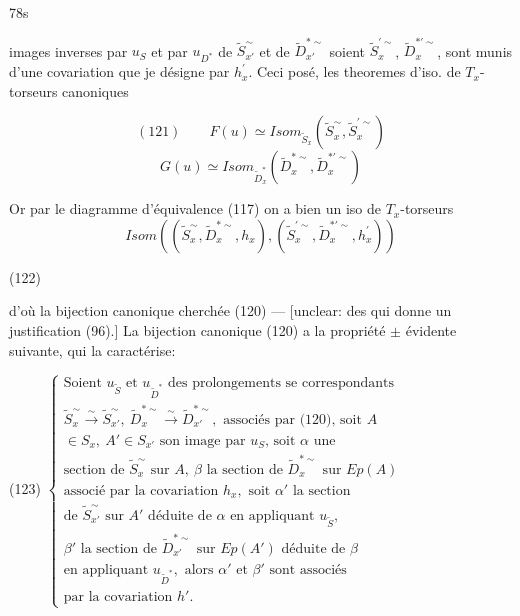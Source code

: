 78s

images inverses par $u_S$ et par $u_{D^*}$ de $\tilde{S}_{x'}^\sim$ et de $\tilde{D}_{x'}^{* \sim}$
soient $\tilde{S}_x^{\prime \sim}$, $\tilde{D}_x^{* \prime \sim}$, sont munis d'une covariation
que je désigne par $h_x^\prime$. Ceci posé, les theoremes
d'iso. de $T_x$-torseurs canoniques

$$ (121) \qquad F(u) \simeq Isom_{\tilde{S}_x}(\tilde{S}_x^\sim, \tilde{S}_x^{\prime \sim}) $$
$$ G(u) \simeq Isom_{\tilde{D}_x^*}(\tilde{D}_x^{*\sim}, \tilde{D}_x^{* \prime \sim}) $$

Or par le diagramme d'équivalence (117) on
a bien un iso de $T_x$-torseurs
$$ Isom((\tilde{S}_x^\sim, \tilde{D}_x^{*\sim}, h_x), (\tilde{S}_x^{\prime \sim}, \tilde{D}_x^{* \prime \sim}, h_x^\prime)) $$

(122)

d'où la bijection canonique cherchée (120) —
[unclear: des qui donne un justification (96).]
La bijection canonique (120) a la
propriété $\pm$ évidente suivante, qui la caractérise:

(123) $\begin{cases}
\text{Soient } u_{\tilde{S}} \text{ et } u_{\tilde{D}^*} \text{ des prolongements se correspondants} \\
\tilde{S}_x^\sim \xrightarrow{\sim} \tilde{S}_{x'}^\sim, \ \tilde{D}_x^{*\sim} \xrightarrow{\sim} \tilde{D}_{x'}^{* \sim}, \text{ associés par (120), soit } A \\
\in S_x, \ A' \in S_{x'} \text{ son image par } u_S \text{, soit } \alpha \text{ une} \\
\text{section de } \tilde{S}_x^\sim \text{ sur } A, \ \beta \text{ la section de } \tilde{D}_x^{*\sim} \text{ sur } Ep(A) \\
\text{associé par la covariation } h_x, \text{ soit } \alpha' \text{ la section} \\
\text{de } \tilde{S}_{x'}^\sim \text{ sur } A' \text{ déduite de } \alpha \text{ en appliquant } u_{\tilde{S}}, \\
\beta' \text{ la section de } \tilde{D}_{x'}^{* \sim} \text{ sur } Ep(A') \text{ déduite de } \beta \\
\text{en appliquant } u_{\tilde{D}^*}, \text{ alors } \alpha' \text{ et } \beta' \text{ sont associés} \\
\text{par la covariation } h'.
\end{cases}$

